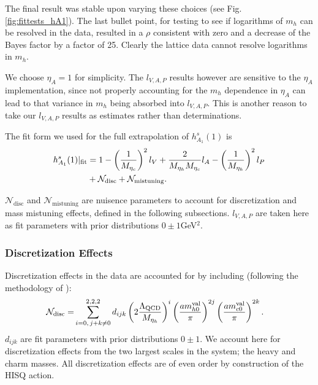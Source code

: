 The final result was stable upon varying these choices (see Fig. \ref{fig:fittests_hA1}). The last bullet point, for testing to see if logarithms of $m_h$ can be resolved in the data, resulted in a $\rho$ consistent with zero and a decrease of the Bayes factor by a factor of 25. Clearly the lattice data cannot resolve logarithms in $m_h$.

We choose $\eta_A=1$ for simplicity. The $l_{V,A,P}$ results however are sensitive to the $\eta_A$ implementation, since not properly accounting for the $m_h$ dependence in $\eta_A$ can lead to that variance in $m_h$ being absorbed into $l_{V,A,P}$. This is another reason to take our $l_{V,A,P}$ results as estimates rather than determinations.

The fit form we used for the full extrapolation of $h_{A_1}^s(1)$ is
\begin{align}
  h^s_{A_1}(1)|_{\text{fit}} &= 1 - \left({1\over M_{\eta_c}}\right)^2 l_V + {2\over M_{\eta_h}M_{\eta_c}} l_A- \left({1\over M_{\eta_h}}\right)^2 l_P  \nonumber \\ &+ \mathcal{N}_{\text{disc}} + \mathcal{N}_{\text{mistuning}}.
  \label{eq:fitform}
\end{align}

$\mathcal{N}_{\text{disc}}$ and $\mathcal{N}_{\text{mistuning}}$ are nuisence parameters to account for discretization and mass mistuning effects, defined in the following subsections. $l_{V,A,P}$ are taken here as fit parameters with prior distributions $0\pm 1 $GeV$^2$.

\subsubsection{Discretization Effects}

Discretization effects in the data are accounted for by including (following the methodology of \cite{McNeile:2012qf}):
\begin{align}
    \label{eq:fitfun_hA1}
  \mathcal{N}_{\text{disc}} = &\sum_{i=0,\,j+k\neq 0}^{2,2,2} d_{ijk} \left(2{\Lambda_{\text{QCD}}\over M_{\eta_h} }\right)^{i} \left({ am^{\text{val}}_{h0} \over \pi }\right)^{2j} \left({ am^{\text{val}}_{c0} \over \pi }\right)^{2k}.
\end{align}
$d_{ijk}$ are fit parameters with prior distributions $0\pm 1$. We account here for discretization effects from the two largest scales in the system; the heavy and charm masses. All discretization effects are of even order by construction of the HISQ action.

